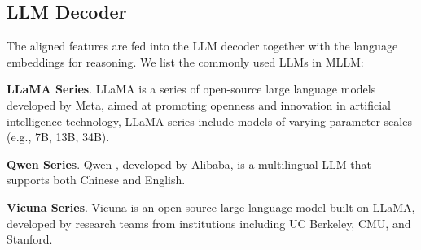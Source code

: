 \subsection{LLM Decoder}
The aligned features are fed into the LLM decoder together with the language embeddings for reasoning. We list the commonly used LLMs in MLLM:

\noindent \textbf{LLaMA Series}. LLaMA \cite{touvron2023llama, touvron2023llama2, dubey2024llama} is a series of open-source large language models developed by Meta, aimed at promoting openness and innovation in artificial intelligence technology, LLaMA series include models of varying parameter scales (e.g., 7B, 13B, 34B). 

\noindent \textbf{Qwen Series}. Qwen \cite{bai2023qwen,yang2024qwen2}, developed by Alibaba, is a multilingual LLM that supports both Chinese and English.


\noindent \textbf{Vicuna Series}. Vicuna \cite{zheng2023judging} is an open-source large language model built on LLaMA, developed by research teams from institutions including UC Berkeley, CMU, and Stanford. 



